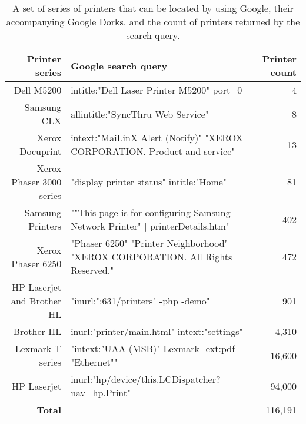 \begin{table*}
    \centering
\label{printer_dorks}
\begin{tabular}{r| p{9cm} | r}
    \hline
    \hline
    {\bf Printer series} & {\bf Google search query} & {\bf Printer count} \\
    \hline    
    Dell M5200 & intitle:"Dell Laser Printer M5200" port\_0 & 4 \\
    \hline
    Samsung CLX & allintitle:"SyncThru Web Service" & 8 \\
    \hline
    Xerox Docuprint & intext:"MaiLinX Alert (Notify)" "XEROX CORPORATION. Product and service" & 13 \\
    \hline
    Xerox Phaser 3000 series & "display printer status" intitle:"Home" & 81 \\
    \hline
    Samsung Printers & ""This page is for configuring Samsung Network Printer" | printerDetails.htm" & 402 \\
    \hline
    Xerox Phaser 6250 & "Phaser 6250" "Printer Neighborhood" "XEROX CORPORATION. All Rights Reserved." & 472 \\
    \hline
    HP Laserjet and Brother HL & "inurl:":631/printers" -php -demo" & 901 \\
    \hline
    Brother HL & inurl:"printer/main.html" intext:"settings" & 4,310 \\
    \hline
    Lexmark T series & "intext:"UAA (MSB)"  Lexmark -ext:pdf "Ethernet"" & 16,600 \\
    \hline
    HP Laserjet & inurl:"hp/device/this.LCDispatcher?nav=hp.Print" & 94,000 \\
    \hline
    \hline
    {\bf Total} & & 116,191 \\
    \hline
\end{tabular}
\caption{A set of series of printers that can be located by using Google, their accompanying Google Dorks, and the count of printers returned by the search query.}
\end{table*}
